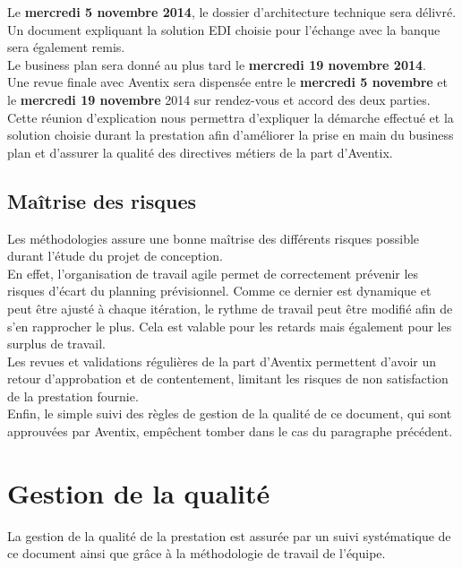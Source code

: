 Le \textbf{mercredi 5 novembre 2014}, le dossier d'architecture technique sera délivré.
Un document expliquant la solution EDI choisie pour l'échange avec la banque
sera également remis. \\

Le business plan sera donné au plus tard le \textbf{mercredi 19 novembre 2014}. \\

Une revue finale avec Aventix sera dispensée entre le \textbf{mercredi 5
  novembre} et le \textbf{mercredi 19 novembre} 2014 sur rendez-vous et accord
des deux parties.  Cette réunion d'explication nous permettra d'expliquer la
démarche effectué et la solution choisie durant la prestation afin d'améliorer
la prise en main du business plan et d'assurer la qualité des directives
métiers de la part d'Aventix. \\

\subsection{Maîtrise des risques}
Les méthodologies assure une bonne maîtrise des différents risques possible
durant l'étude du projet de conception. \\

En effet, l'organisation de travail agile permet de correctement prévenir les
risques d'écart du planning prévisionnel. Comme ce dernier est dynamique et
peut être ajusté à chaque itération, le rythme de travail peut être modifié
afin de s'en rapprocher le plus. Cela est valable pour les retards mais
également pour les surplus de travail. \\

Les revues et validations régulières de la part d'Aventix permettent d'avoir un
retour d'approbation et de contentement, limitant les risques de non
satisfaction de la prestation fournie. \\

Enfin, le simple suivi des règles de gestion de la qualité de ce document, qui
sont approuvées par Aventix, empêchent tomber dans le cas du paragraphe
précédent. \\

\section{Gestion de la qualité}
La gestion de la qualité de la prestation est assurée par un suivi systématique
de ce document ainsi que grâce à la méthodologie de travail de l'équipe. \\

